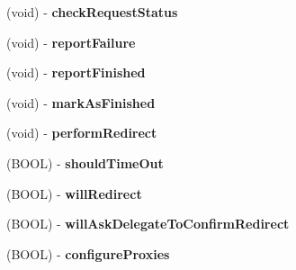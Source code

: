 \begin{DoxyCompactItemize}
\item 
\hypertarget{interface_a_s_i_h_t_t_p_request_07_08_a068fc55ba6cb87ad880bded7fd78ab27}{
(void) -\/ {\bfseries check\-Request\-Status}}
\label{interface_a_s_i_h_t_t_p_request_07_08_a068fc55ba6cb87ad880bded7fd78ab27}

\item 
\hypertarget{interface_a_s_i_h_t_t_p_request_07_08_af147c15ba579966f7d4793ebe1eb881b}{
(void) -\/ {\bfseries report\-Failure}}
\label{interface_a_s_i_h_t_t_p_request_07_08_af147c15ba579966f7d4793ebe1eb881b}

\item 
\hypertarget{interface_a_s_i_h_t_t_p_request_07_08_aec6fbf664802e3be7fd4c24a9824e219}{
(void) -\/ {\bfseries report\-Finished}}
\label{interface_a_s_i_h_t_t_p_request_07_08_aec6fbf664802e3be7fd4c24a9824e219}

\item 
\hypertarget{interface_a_s_i_h_t_t_p_request_07_08_a3218690ab3ce9d401f26f7e0d0e2c995}{
(void) -\/ {\bfseries mark\-As\-Finished}}
\label{interface_a_s_i_h_t_t_p_request_07_08_a3218690ab3ce9d401f26f7e0d0e2c995}

\item 
\hypertarget{interface_a_s_i_h_t_t_p_request_07_08_a2862f6f1db8f1146e96470f926561b93}{
(void) -\/ {\bfseries perform\-Redirect}}
\label{interface_a_s_i_h_t_t_p_request_07_08_a2862f6f1db8f1146e96470f926561b93}

\item 
\hypertarget{interface_a_s_i_h_t_t_p_request_07_08_acedb1516f19af14df7b44602b700bae3}{
(\-B\-O\-O\-L) -\/ {\bfseries should\-Time\-Out}}
\label{interface_a_s_i_h_t_t_p_request_07_08_acedb1516f19af14df7b44602b700bae3}

\item 
\hypertarget{interface_a_s_i_h_t_t_p_request_07_08_af19d1ede897c67a86b4d8a62c6395863}{
(\-B\-O\-O\-L) -\/ {\bfseries will\-Redirect}}
\label{interface_a_s_i_h_t_t_p_request_07_08_af19d1ede897c67a86b4d8a62c6395863}

\item 
\hypertarget{interface_a_s_i_h_t_t_p_request_07_08_a38bb6d3bfc36a47f3ace0665762660ae}{
(\-B\-O\-O\-L) -\/ {\bfseries will\-Ask\-Delegate\-To\-Confirm\-Redirect}}
\label{interface_a_s_i_h_t_t_p_request_07_08_a38bb6d3bfc36a47f3ace0665762660ae}

\item 
\hypertarget{interface_a_s_i_h_t_t_p_request_07_08_a81e707733dd891e98faf51eb37093845}{
(\-B\-O\-O\-L) -\/ {\bfseries configure\-Proxies}}
\label{interface_a_s_i_h_t_t_p_request_07_08_a81e707733dd891e98faf51eb37093845}


\end{DoxyCompactItemize}
